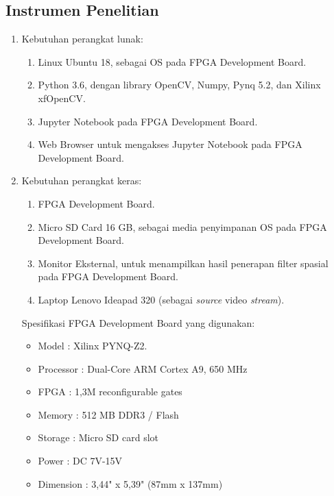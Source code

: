 \subsection{Instrumen Penelitian}
\begin{enumerate}[topsep=0pt,itemsep=0pt,partopsep=0pt, parsep=0pt]
    \item Kebutuhan perangkat lunak:
    \begin{enumerate}[topsep=0pt,itemsep=0pt,partopsep=0pt, parsep=0pt, label={\alph*.}]
        \item Linux Ubuntu 18, sebagai OS pada FPGA Development Board.
        \item Python 3.6, dengan library OpenCV, Numpy, Pynq 5.2, dan Xilinx xfOpenCV.
        \item Jupyter Notebook pada FPGA Development Board. 
        \item Web Browser untuk mengakses Jupyter Notebook pada FPGA Development Board.
    \end{enumerate}
    \item Kebutuhan perangkat keras:
    \begin{enumerate}[topsep=0pt,itemsep=0pt,partopsep=0pt, parsep=0pt, label={\alph*.}]
        \item FPGA Development Board.
        \item Micro SD Card 16 GB, sebagai media penyimpanan OS pada FPGA Development Board.
        \item Monitor Eksternal, untuk menampilkan hasil penerapan filter spasial pada FPGA Development Board.
        \item Laptop Lenovo Ideapad 320 (sebagai \textit{source} video \textit{stream}).
    \end{enumerate}

    Spesifikasi FPGA Development Board yang digunakan:
    \begin{itemize}[topsep=0pt,itemsep=0pt,partopsep=0pt, parsep=0pt]
        \item Model : Xilinx PYNQ-Z2.
        \item Processor : Dual-Core ARM Cortex A9, 650 MHz
        \item FPGA : 1,3M reconfigurable gates
        \item Memory : 512 MB DDR3 / Flash
        \item Storage : Micro SD card slot
        \item Power : DC 7V-15V
        \item Dimension : 3,44" x 5,39" (87mm x 137mm)
    \end{itemize}
\end{enumerate}

